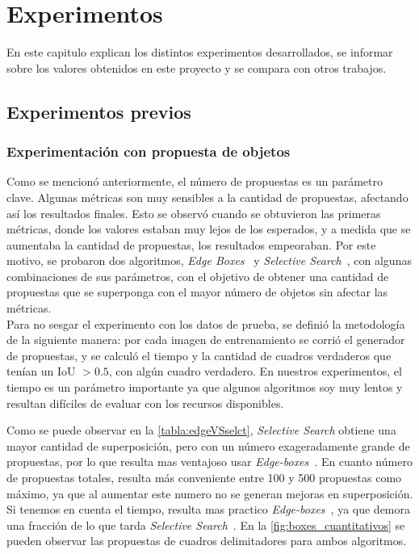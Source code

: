 \chapter{Experimentos}\label{cap:experimentos}

En este capitulo explican los distintos experimentos desarrollados, se informar sobre los valores obtenidos en este proyecto y se compara con otros trabajos. 


\section{Experimentos previos}

\subsection{Experimentación con propuesta de objetos} \label{ssec:experimentacionconpropuestadeobjetos}
Como se mencionó anteriormente, el número de propuestas es un parámetro clave. Algunas métricas son muy sensibles a la cantidad de propuestas, afectando así los resultados finales. Esto se observó cuando se obtuvieron las primeras métricas, donde los valores estaban muy lejos de los esperados, y a medida que se aumentaba la cantidad de propuestas, los resultados empeoraban. Por este motivo, se probaron dos algoritmos, \textit{Edge Boxes}~\cite{zitnick2014edge} y \textit{Selective Search}~\cite{uijlings2013selective}, con algunas combinaciones de sus parámetros, con el objetivo de obtener una cantidad de propuestas que se superponga con el mayor número de objetos sin afectar las métricas.\\

Para no sesgar el experimento con los datos de prueba, se definió la metodología de la siguiente manera: por cada imagen de entrenamiento se corrió el generador de propuestas, y se calculó el tiempo y la cantidad de cuadros verdaderos que tenían un IoU $> 0.5$, con algún cuadro verdadero. En nuestros experimentos, el tiempo es un parámetro importante ya que algunos algoritmos soy muy lentos y resultan difíciles de evaluar con los recursos disponibles. 

Como se puede observar en la \autoref{tabla:edgeVSselct}, \textit{Selective Search} obtiene una mayor cantidad de superposición, pero con un número exageradamente grande de propuestas, por lo que resulta mas ventajoso usar \textit{Edge-boxes}~\cite{zitnick2014edge}. En cuanto número de propuestas totales, resulta más conveniente entre 100 y 500 propuestas como máximo, ya que al aumentar este numero no se generan mejoras en superposición. Si tenemos en cuenta el tiempo, resulta mas practico \textit{Edge-boxes}~\cite{zitnick2014edge}, ya que demora una fracción de lo que tarda \textit{Selective Search}~\cite{uijlings2013selective}. En la \autoref{fig:boxes_cuantitativos} se pueden observar las propuestas de cuadros delimitadores para ambos algoritmos.

